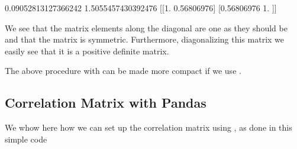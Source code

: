 \documentclass[letterpaper,10pt,english]{sphinxmanual}
\begin{document}
\begin{sphinxVerbatim}[commandchars=\\\{\}]
0.09052813127366242
1.5055457430392476
[[1.         0.56806976]
 [0.56806976 1.        ]]
\end{sphinxVerbatim}

We see that the matrix elements along the diagonal are one as they
should be and that the matrix is symmetric. Furthermore, diagonalizing
this matrix we easily see that it is a positive definite matrix.

The above procedure with  can be made more compact if we use .


\subsection{Correlation Matrix with Pandas}
\label{\detokenize{chapter4:correlation-matrix-with-pandas}}
We whow here how we can set up the correlation matrix using , as done in this simple code

\begin{sphinxVerbatim}[commandchars=\\\{\}]
   
   
  
  
    
  
    
   
  
  
\end{sphinxVerbatim}
\end{document}
